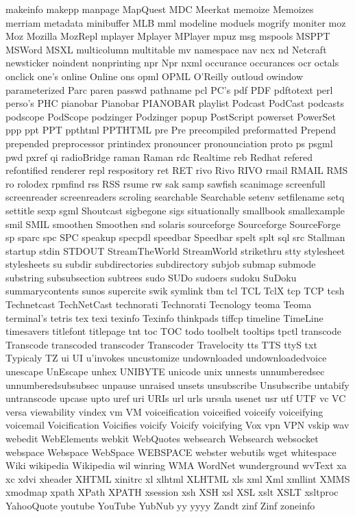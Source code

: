 makeinfo
makepp
manpage
MapQuest
MDC
Meerkat
memoize
Memoizes
merriam
metadata
minibuffer
MLB
mml
modeline
moduels
mogrify
moniter
moz
Moz
Mozilla
MozRepl
mplayer
Mplayer
MPlayer
mpuz
msg
mspools
MSPPT
MSWord
MSXL
multicolumn
multitable
mv
namespace
nav
ncx
nd
Netcraft
newsticker
noindent
nonprinting
npr
Npr
nxml
occurance
occurances
ocr
octals
onclick
one's
online
Online
ons
opml
OPML
O'Reilly
outloud
owindow
parameterized
Parc
paren
passwd
pathname
pcl
PC's
pdf
PDF
pdftotext
perl
perso's
PHC
pianobar
Pianobar
PIANOBAR
playlist
Podcast
PodCast
podcasts
podscope
PodScope
podzinger
Podzinger
popup
PostScript
powerset
PowerSet
ppp
ppt
PPT
ppthtml
PPTHTML
pre
Pre
precompiled
preformatted
Prepend
prepended
preprocessor
printindex
pronouncer
pronounciation
proto
ps
psgml
pwd
pxref
qi
radioBridge
raman
Raman
rdc
Realtime
reb
Redhat
refered
refontified
renderer
repl
respository
ret
RET
rivo
Rivo
RIVO
rmail
RMAIL
RMS
ro
rolodex
rpmfind
rss
RSS
rsume
rw
sak
samp
sawfish
scanimage
screenfull
screenreader
screenreaders
scroling
searchable
Searchable
setenv
setfilename
setq
settitle
sexp
sgml
Shoutcast
sigbegone
sigs
situationally
smallbook
smallexample
smil
SMIL
smoothen
Smoothen
snd
solaris
sourceforge
Sourceforge
SourceForge
sp
sparc
spc
SPC
speakup
specpdl
speedbar
Speedbar
spelt
splt
sql
src
Stallman
startup
stdin
STDOUT
StreamTheWorld
StreamWorld
strikethru
stty
stylesheet
stylesheets
su
subdir
subdirectories
subdirectory
subjob
submap
submode
substring
subsubsection
subtrees
sudo
SUDo
sudoers
sudoku
SuDoku
summarycontents
sunos
supercite
swik
symlink
tbm
tcl
TCL
TclX
tcp
TCP
tcsh
Technetcast
TechNetCast
technorati
Technorati
Tecnology
teoma
Teoma
terminal's
tetris
tex
texi
texinfo
Texinfo
thinkpads
tiffcp
timeline
TimeLine
timesavers
titlefont
titlepage
tnt
toc
TOC
todo
toolbelt
tooltips
tpctl
transcode
Transcode
transcoded
transcoder
Transcoder
Travelocity
tts
TTS
ttyS
txt
Typicaly
TZ
ui
UI
u'invokes
uncustomize
undownloaded
undownloadedvoice
unescape
UnEscape
unhex
UNIBYTE
unicode
unix
unnests
unnumberedsec
unnumberedsubsubsec
unpause
unraised
unsets
unsubscribe
Unsubscribe
untabify
untranscode
upcase
upto
uref
uri
URIs
url
urls
ursula
usenet
usr
utf
UTF
vc
VC
versa
viewability
vindex
vm
VM
voiceification
voiceified
voiceify
voiceifying
voicemail
Voicification
Voicifies
voicify
Voicify
voicifying
Vox
vpn
VPN
vskip
wav
webedit
WebElements
webkit
WebQuotes
websearch
Websearch
websocket
webspace
Webspace
WebSpace
WEBSPACE
webster
webutils
wget
whitespace
Wiki
wikipedia
Wikipedia
wil
winring
WMA
WordNet
wunderground
wvText
xa
xc
xdvi
xheader
XHTML
xinitrc
xl
xlhtml
XLHTML
xls
xml
Xml
xmllint
XMMS
xmodmap
xpath
XPath
XPATH
xsession
xsh
XSH
xsl
XSL
xslt
XSLT
xsltproc
YahooQuote
youtube
YouTube
YubNub
yy
yyyy
Zandt
zinf
Zinf
zoneinfo
